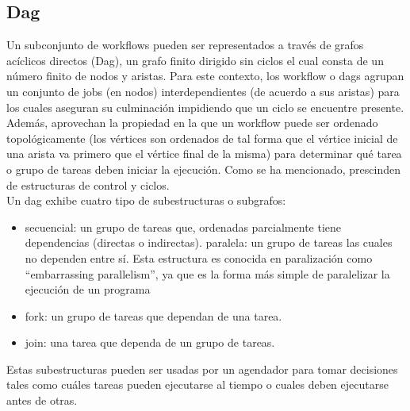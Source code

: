 \subsection{Dag}
Un subconjunto de workflows pueden ser representados a través de grafos acíclicos directos (Dag), un grafo finito dirigido sin ciclos el cual consta de un número finito de nodos y aristas. Para este contexto, los workflow o dags agrupan un conjunto de jobs (en nodos) interdependientes (de acuerdo a sus aristas) para los cuales aseguran su culminación impidiendo que un ciclo se encuentre presente. Además, aprovechan la propiedad en la que un workflow puede ser ordenado topológicamente (los vértices son ordenados de tal forma que el vértice inicial de una arista va primero que el vértice final de la misma) para determinar qué tarea o grupo de tareas deben iniciar la ejecución. Como se ha mencionado, prescinden de estructuras de control y ciclos.\\

Un dag exhibe cuatro tipo de subestructuras o subgrafos:
\begin{itemize}
\item secuencial: un grupo de tareas que, ordenadas parcialmente tiene dependencias (directas o indirectas).
paralela: un grupo de tareas las cuales no dependen entre sí. Esta estructura es conocida en paralización como “embarrassing parallelism”, ya que es la forma más simple de paralelizar la ejecución de un programa
\item fork: un grupo de tareas que dependan de una tarea.
\item join: una tarea que dependa de un grupo de tareas.
\end{itemize}

Estas subestructuras pueden ser usadas por un agendador para tomar decisiones tales como cuáles tareas pueden ejecutarse al tiempo o cuales deben ejecutarse antes de otras.

